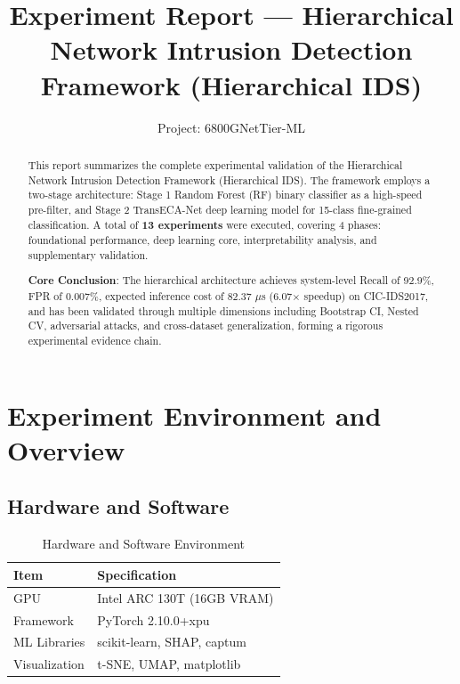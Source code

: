 \documentclass[sigconf]{acmart}
\begin{document}
\title{Experiment Report --- Hierarchical Network Intrusion Detection Framework (Hierarchical IDS)}

\author{Project: 6800GNetTier-ML}

\begin{abstract}
This report summarizes the complete experimental validation of the Hierarchical Network Intrusion Detection Framework (Hierarchical IDS). The framework employs a two-stage architecture: Stage 1 Random Forest (RF) binary classifier as a high-speed pre-filter, and Stage 2 TransECA-Net deep learning model for 15-class fine-grained classification. A total of \textbf{13 experiments} were executed, covering 4 phases: foundational performance, deep learning core, interpretability analysis, and supplementary validation.

\textbf{Core Conclusion}: The hierarchical architecture achieves system-level Recall of 92.9\%, FPR of 0.007\%, expected inference cost of 82.37 $\mu$s (6.07$\times$ speedup) on CIC-IDS2017, and has been validated through multiple dimensions including Bootstrap CI, Nested CV, adversarial attacks, and cross-dataset generalization, forming a rigorous experimental evidence chain.
\end{abstract}

\maketitle

\section{Experiment Environment and Overview}

\subsection{Hardware and Software}

\begin{table}[H]
\caption{Hardware and Software Environment}
\label{tab:hardware}
\begin{tabular}{ll}
\toprule
\textbf{Item} & \textbf{Specification} \\
\midrule
GPU & Intel ARC 130T (16GB VRAM) \\
Framework & PyTorch 2.10.0+xpu \\
ML Libraries & scikit-learn, SHAP, captum \\
Visualization & t-SNE, UMAP, matplotlib \\
\bottomrule
\end{tabular}
\end{table}
\end{document}
